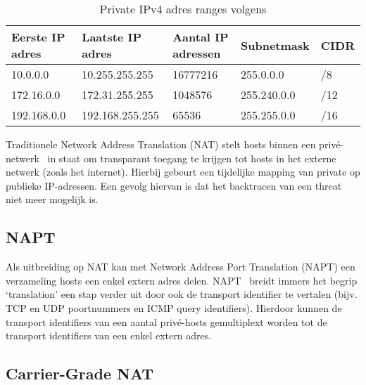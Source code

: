 \begin{table}[!htbp]
    \caption{Private IPv4 adres ranges volgens \textcite{Moskowitz1996}}
    \label{tab:PrivateIPv4AdressRanges}
    \begin{tabular}{lllll}
        \hline
        \multicolumn{1}{|l|}{Eerste IP adres} & \multicolumn{1}{l|}{Laatste IP adres} & \multicolumn{1}{l|}{Aantal IP adressen} & \multicolumn{1}{l|}{Subnetmask} & \multicolumn{1}{l|}{CIDR} \\ \hline
        10.0.0.0                               & 10.255.255.255                       & 16777216                                    & 255.0.0.0                       & /8                        \\
        172.16.0.0                             & 172.31.255.255                       & 1048576                                     & 255.240.0.0                     & /12                       \\
        192.168.0.0                            & 192.168.255.255                      & 65536                                       & 255.255.0.0                     & /16
    \end{tabular}
\end{table}

Traditionele Network Address Translation (NAT) stelt hosts binnen een privé-netwerk~\autocite{Moskowitz1996} in staat om transparant toegang te krijgen tot hosts in het externe netwerk (zoals het internet).
Hierbij gebeurt een tijdelijke mapping van private op publieke IP-adressen. Een gevolg hiervan is dat het backtracen van een threat niet meer mogelijk is.

\subsection{NAPT}
Als uitbreiding op NAT kan met Network Address Port Translation (NAPT) een verzameling hosts een enkel extern adres delen. NAPT~\autocite{Holdrege1999} breidt immers het begrip ‘translation’ een stap verder uit door ook de transport identifier te vertalen (bijv. TCP en UDP poortnummers en ICMP query identifiers). Hierdoor kunnen de transport identifiers van een aantal privé-hosts gemultiplext worden tot de\\transport identifiers van een enkel extern adres.

\subsection{Carrier-Grade NAT}

